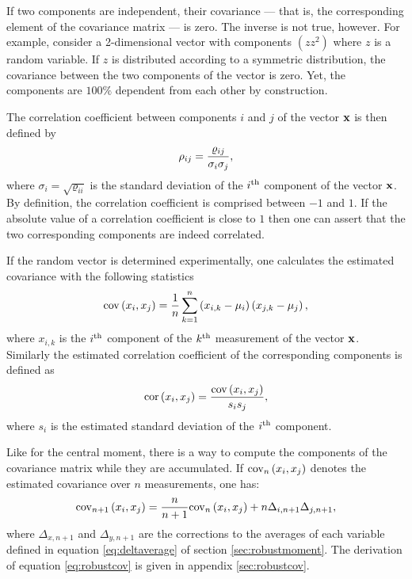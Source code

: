 \documentclass[twoside]{book}
\begin{document}

If two components are independent, their covariance --- that is,
the corresponding element of the covariance matrix --- is zero.
The inverse is not true, however. For example, consider a
2-dimensional vector with components $\left(z z^2\right)$ where
$z$ is a random variable. If $z$ is distributed according to a
symmetric distribution, the covariance between the two components
of the vector is zero. Yet, the components are $100\%$ dependent
from each other by construction.

The correlation coefficient between components $i$ and $j$ of the
vector ${\bf x}$ is then defined by
\begin{equation}
 \rho_{ij}={\varrho_{ij}\over \sigma_i \sigma_j},
\end{equation}
where $\sigma_i=\sqrt{\varrho_{ii}}$ is the standard deviation of
the $i^{\mathop{\rm th}}$ component of the vector ${\bf x}$. By definition, the
correlation coefficient is comprised between $-1$ and $1$. If the
absolute value of a correlation coefficient is close to $1$ then
one can assert that the two corresponding components are indeed
correlated.

If the random vector is determined experimentally, one calculates
the estimated covariance with the following statistics
\begin{equation}
 \mathop{\rm cov}\left(x_i,x_j\right)={1\over n}\sum_{k=1}^n
 \left(x_{i,k}-\mu_i\right)\left(x_{j,k}-\mu_j\right),
\end{equation}
where $x_{i,k}$ is the $i^{\mathop{\rm th}}$ component of the $k^{\mathop{\rm th}}$ measurement
of the vector ${\bf x}$. Similarly the estimated correlation
coefficient of the corresponding components is defined as
\begin{equation}
 \mathop{\rm cor}\left(x_i,x_j\right)={\mathop{\rm cov}\left(x_i,x_j\right)\over s_i s_j},
\end{equation}
where $s_i$ is the estimated standard deviation of the $i^{\mathop{\rm th}}$
component.

Like for the central moment, there is a way to compute the
components of the covariance matrix while they are accumulated. If
${\mathop{\rm cov}}_n\left(x_i,x_j\right)$ denotes the estimated covariance
over $n$ measurements, one has:
\begin{equation}
\label{eq:robustcov}
 {\mathop{\rm cov}}_{n+1}\left(x_i,x_j\right)={n\over
 n+1}{\mathop{\rm cov}}_n\left(x_i,x_j\right)+n\Delta_{i,n+1}\Delta_{j,n+1},
\end{equation}
where $\Delta_{x,n+1}$ and $\Delta_{y,n+1}$ are the corrections to
the averages of each variable defined in equation
\ref{eq:deltaverage} of section \ref{sec:robustmoment}. The
derivation of equation \ref{eq:robustcov} is given in appendix
\ref{sec:robustcov}.
\end{document}
